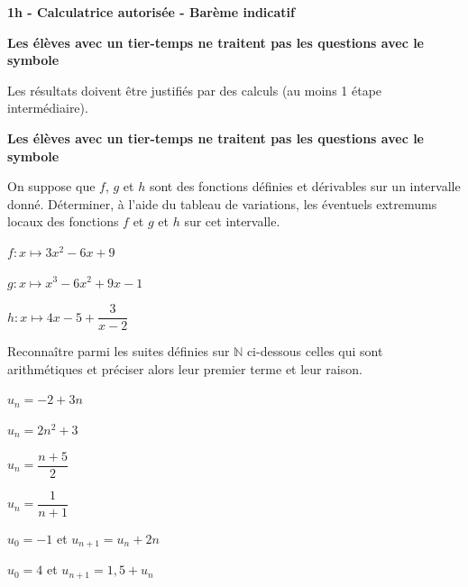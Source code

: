\documentclass[12pt,a4paper]{article}  %
\begin{document}
\graphicspath{{images/}}

\begin{center}

\end{center}


\begin{center}\textbf{1h - Calculatrice autorisée - Barème indicatif}\end{center}

\begin{center}\textbf{Les élèves avec un tier-temps ne traitent pas les questions avec  le symbole }\end{center}

\begin{center}
Les résultats doivent être justifiés par des calculs (au moins 1 étape intermédiaire).
\end{center}

\begin{center}\textbf{Les élèves avec un tier-temps ne traitent pas les questions avec  le symbole }\end{center}

On suppose que $f$, $g$ et $h$ sont des fonctions définies et dérivables sur un intervalle donné. Déterminer, à l'aide du tableau de variations, les éventuels extremums locaux des fonctions $f$ et $g$ et $h$ sur cet intervalle.
\begin{enumMet}
    \item $f: x \mapsto 3x^{2}-6 x+9$
    \item $g: x \mapsto x^{3}-6 x^{2}+9 x-1$
    \item {} $h: x \mapsto 4x-5+\dfrac{3}{x-2}$
\end{enumMet}


Reconnaître parmi les suites définies sur $\mathbb{N}$ ci-dessous celles qui sont arithmétiques et préciser alors leur premier terme et leur raison.
\begin{enumMet}
    \item $u_{n}=-2+3 n$
    \item $u_{n}=2 n^{2}+3$
    \item $u_{n}=\dfrac{n+5}{2}$
    \item $u_{n}=\dfrac{1}{n+1}$
    \item $u_{0}=-1$ et $u_{n+1}=u_{n}+2 n$
    \item $u_{0}=4$ et $u_{n+1}=1,5+u_{n}$
\end{enumMet}
\end{document}
